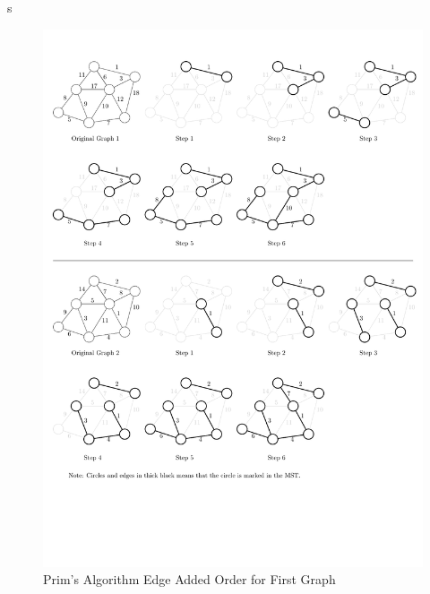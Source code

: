\begin{homeworkProblem}
\begin{homeworkSubProblem}
s
    \begin{figure}[H]
        \caption{Prim's Algorithm Edge Added Order for First Graph}\label{4}
        \centering
        \includegraphics[width=\textwidth]{running4}
    \end{figure}
\end{homeworkSubProblem}
\end{homeworkProblem}
